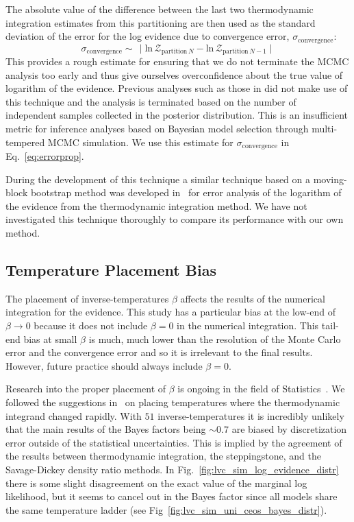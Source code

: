 The absolute value of the difference between the last two thermodynamic integration estimates from this partitioning are then used as the standard deviation of the error for the log evidence due to convergence error, $\sigma_{\mathrm{convergence}}$:
\begin{equation}
    \sigma_{\mathrm{convergence}} \sim  \, \mid \mathrm{ln} \, \mathcal{Z}_{\mathrm{partition \,} N} - \mathrm{ln} \, \mathcal{Z}_{\mathrm{partition \,} N-1} \mid
\end{equation}
This provides a rough estimate for ensuring that we do not terminate the MCMC analysis too early and thus give ourselves overconfidence about the true value of logarithm of the evidence. Previous analyses such as those in \cite{de2018tidal} did not make use of this technique and the analysis is terminated based on the number of independent samples collected in the posterior distribution. This is an insufficient metric for inference analyses based on Bayesian model selection through multi-tempered MCMC simulation. We use this estimate for $\sigma_{\mathrm{convergence}}$ in Eq.~\ref{eq:errorprop}.

During the development of this technique a similar technique based on a moving-block bootstrap method was developed in~\cite{Russel:2018pqv} for error analysis of the logarithm of the evidence from the thermodynamic integration method. We have not investigated this technique thoroughly to compare its performance with our own method.

\subsection{Temperature Placement Bias}
The placement of inverse-temperatures $\beta$ affects the results of the numerical integration for the evidence\citep{lartillot2006computing, xie2010improving}. This study has a particular bias at the low-end of $\beta \to 0$ because it does not include $\beta = 0$ in the numerical integration. This tail-end bias at small $\beta$ is much, much lower than the resolution of the Monte Carlo error and the convergence error and so it is irrelevant to the final results. However, future practice should always include $\beta =0$.

Research into the proper placement of $\beta$ is ongoing in the field of Statistics~\citep{annis2019thermodynamic}. We followed the suggestions in~\cite{liu2016evaluating} on placing temperatures where the thermodynamic integrand changed rapidly. With $51$ inverse-temperatures it is incredibly unlikely that the main results of the Bayes factors being $\sim 0.7$ are biased by discretization error outside of the statistical uncertainties. This is implied by the agreement of the results between thermodynamic integration, the steppingstone, and the Savage-Dickey density ratio methods. In Fig.~\ref{fig:lvc_sim_log_evidence_distr} there is some slight disagreement on the exact value of the marginal log likelihood, but it seems to cancel out in the Bayes factor since all models share the same temperature ladder (see Fig~\ref{fig:lvc_sim_uni_ceos_bayes_distr}).

